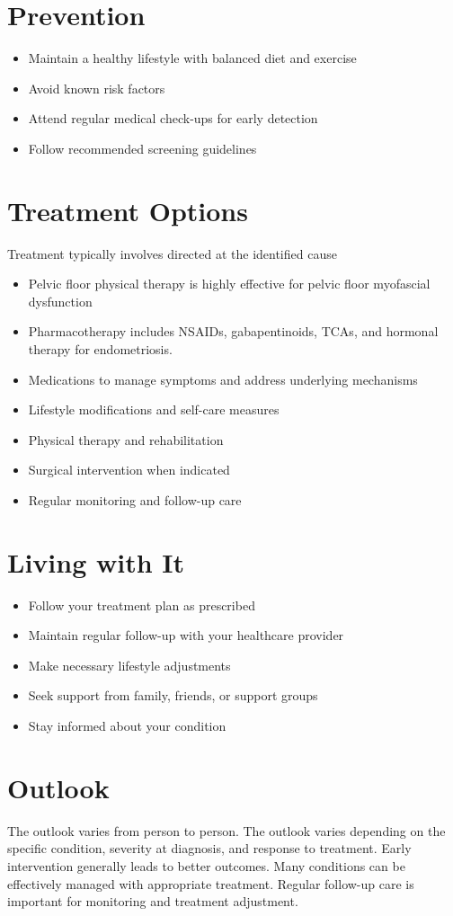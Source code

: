 \section{Prevention}
\begin{itemize}[noitemsep]
  \item Maintain a healthy lifestyle with balanced diet and exercise
  \item Avoid known risk factors
  \item Attend regular medical check-ups for early detection
  \item Follow recommended screening guidelines
\end{itemize}
\section{Treatment Options}
Treatment typically involves directed at the identified cause

\begin{itemize}[noitemsep]
  \item Pelvic floor physical therapy is highly effective for pelvic floor myofascial dysfunction
  \item Pharmacotherapy includes NSAIDs, gabapentinoids, TCAs, and hormonal therapy for endometriosis.
  \item Medications to manage symptoms and address underlying mechanisms
  \item Lifestyle modifications and self-care measures
  \item Physical therapy and rehabilitation
  \item Surgical intervention when indicated
  \item Regular monitoring and follow-up care
\end{itemize}
\section{Living with It}
\begin{itemize}[noitemsep]
  \item Follow your treatment plan as prescribed
  \item Maintain regular follow-up with your healthcare provider
  \item Make necessary lifestyle adjustments
  \item Seek support from family, friends, or support groups
  \item Stay informed about your condition
\end{itemize}
\section{Outlook}
The outlook varies from person to person. The outlook varies depending on the specific condition, severity at diagnosis, and response to treatment. Early intervention generally leads to better outcomes. Many conditions can be effectively managed with appropriate treatment. Regular follow-up care is important for monitoring and treatment adjustment.
